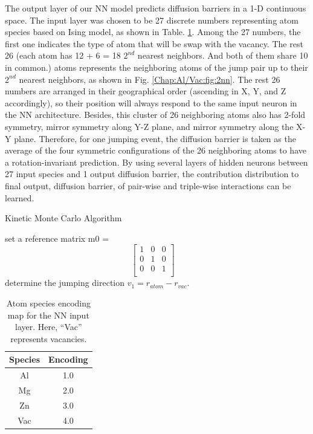 The output layer of our \ac{NN} model predicts diffusion barriers in a 1-D continuous space. The input layer was chosen to be 27 discrete numbers representing atom species based on Ising model, as shown in Table. \ref{Chap:Al/Vac:tab:mapping}. Among the 27 numbers, the first one indicates the type of atom that will be swap with the vacancy. The rest 26 (each atom has 12 + 6 = 18 $\text{2}^{nd}$ nearest neighbors. And both of them share 10 in common.) atoms represents the neighboring atoms of the jump pair up to their $\text{2}^{nd}$ nearest neighbors, as shown in Fig. \ref{Chap:Al/Vac:fig:2nn}. The rest 26 numbers are arranged in their geographical order (ascending in X, Y, and Z accordingly), so their position will always respond to the same input neuron in the \ac{NN} architecture. Besides, this cluster of 26 neighboring atoms also has 2-fold symmetry, mirror symmetry along Y-Z plane, and mirror symmetry along the X-Y plane. Therefore, for one jumping event, the diffusion barrier is taken as the average of the four symmetric configurations of the 26 neighboring atoms to have a rotation-invariant prediction. By using several layers of hidden neurons between 27 input species and 1 output diffusion barrier, the contribution distribution to final output, diffusion barrier, of pair-wise and triple-wise interactions can be learned.


\begin{algorithm}
  \caption{Kinetic Monte Carlo Algorithm}\label{algo:encode}
  \begin{algorithmic}[1]
  \State set a reference matrix m0 = 
$$
\begin{bmatrix} 
1 & 0 & 0 \\
0 & 1 & 0 \\
0 & 0 & 1 \\
\end{bmatrix}
\quad
$$ 
  \State determine the jumping direction $v_1 = r_{atom} - r_{vac}$.
  
\end{algorithmic}
\end{algorithm}


\begin{table}[!htbp]
\centering
\caption[Atom species encoding map for the \acf{NN} input layer.]{Atom species encoding map for the \acf{NN} input layer. Here, ``Vac'' represents vacancies.}
\label{Chap:Al/Vac:tab:mapping}
\begin{tabular}{cc}
\\
\hline
\hline
Species & Encoding  \\ \hline
Al & 1.0 \\
Mg & 2.0 \\
Zn & 3.0 \\
Vac & 4.0 \\
\hline
\hline
\end{tabular}
\end{table}


